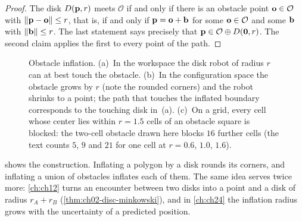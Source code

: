 \begin{proof}
The disk $D(\mathbf{p},r)$ meets $\mathcal{O}$ if and only if there is an obstacle point $\mathbf{o}\in\mathcal{O}$ with $\left\lVert \mathbf{p}-\mathbf{o} \right\rVert\le r$, that is, if and only if $\mathbf{p}=\mathbf{o}+\mathbf{b}$ for some $\mathbf{o}\in\mathcal{O}$ and some $\mathbf{b}$ with $\left\lVert \mathbf{b} \right\rVert\le r$. The last statement says precisely that $\mathbf{p}\in\mathcal{O}\oplus D(\mathbf{0},r)$. The second claim applies the first to every point of the path. \qedhere
\end{proof}

\begin{figure}[tb]
  \centering
  \caption{Obstacle inflation. (a)~In the workspace the disk robot of radius $r$ can at best touch the obstacle. (b)~In the configuration space the obstacle grows by $r$ (note the rounded corners) and the robot shrinks to a point; the path that touches the inflated boundary corresponds to the touching disk in~(a). (c)~On a grid, every cell whose center lies within $r=1.5$ cells of an obstacle square is blocked: the two-cell obstacle drawn here blocks $16$ further cells (the text counts $5$, $9$ and $21$ for one cell at $r=0.6$, $1.0$, $1.6$).}
  \label{fig:ch02-minkowski}
\end{figure}

 shows the construction. Inflating a polygon by a disk rounds its corners, and inflating a union of obstacles inflates each of them. The same idea serves twice more: \cref{ch:ch12} turns an encounter between two disks into a point and a disk of radius $r_A+r_B$ (\cref{thm:ch02-disc-minkowski}), and in \cref{ch:ch24} the inflation radius grows with the uncertainty of a predicted position.

